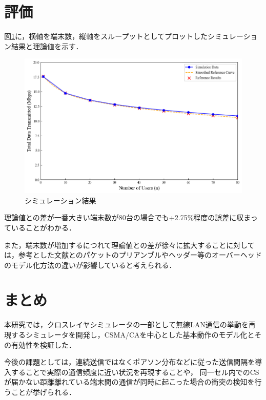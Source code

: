 \documentclass[a4paper, 10pt]{ltjsarticle}
\begin{document}
\section{評価}
図\ref{fig:simulation-result}に，横軸を端末数，縦軸をスループットとしてプロットしたシミュレーション結果と理論値を示す．


\begin{figure}[H]
  \centering
  \includegraphics[width=1\columnwidth]{./assets/g3.png}
  \caption{シミュレーション結果}
  \label{fig:simulation-result}
\end{figure}


理論値との差が一番大きい端末数が80台の場合でも+2.75\%程度の誤差に収まっていることがわかる．

また，端末数が増加するにつれて理論値との差が徐々に拡大することに対しては，参考とした文献\cite{paper}とのパケットのプリアンブルやヘッダー等のオーバーヘッドのモデル化方法の違いが影響していると考えられる．

\section{まとめ}
本研究では，クロスレイヤシミュレータの一部として無線LAN通信の挙動を再現するシミュレータを開発し，CSMA/CAを中心とした基本動作のモデル化とその有効性を検証した．

今後の課題としては，連続送信ではなくポアソン分布などに従った送信間隔を導入することで実際の通信頻度に近い状況を再現することや，
同一セル内でのCSが届かない距離離れている端末間の通信が同時に起こった場合の衝突の検知を行うことが挙げられる．



\end{document}
